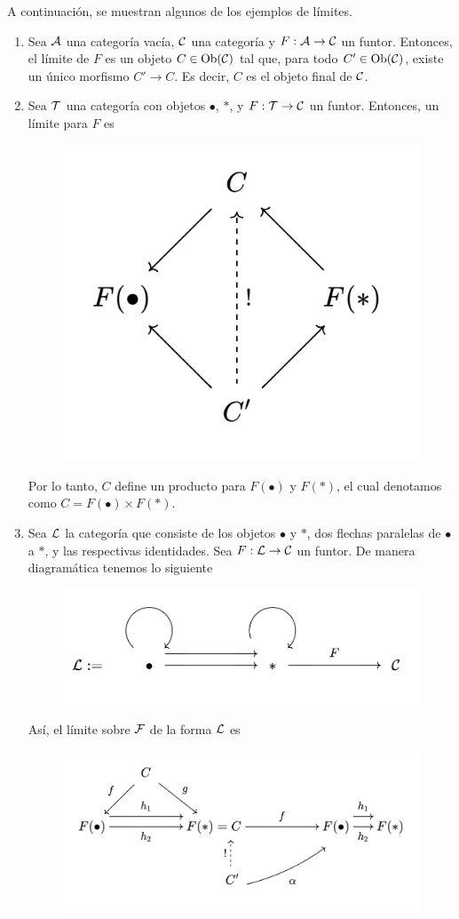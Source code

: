 A continuación, se muestran algunos de los ejemplos de límites. 
\begin{ejp}\label{ejp:lim}\text{ }
    \begin{enumerate}
        \item Sea ${\mathcal A}$ una categoría vacía, ${\mathcal C}$ una categoría y $F:{\mathcal A}\to{\mathcal C}$ un funtor. Entonces, el límite de $F$ es un objeto $C\in\operatorname{Ob}({\mathcal C})$ tal que, para todo $C'\in\operatorname{Ob}({\mathcal C})$, existe un único morfismo $C'\to C$. Es decir, $C$ es el objeto final de ${\mathcal C}$.
        \item Sea ${\mathcal T}$ una categoría con  objetos $\bullet$, $*$, y  $F:{\mathcal T}\to {\mathcal C}$ un funtor. Entonces, un límite para $F$ es 
        \begin{figure}[H]
            \centering
            \includegraphics[width=0.3\linewidth]{img/diagrama5.png}
        \end{figure}
        Por lo tanto, $C$ define un producto para $F(\bullet)$ y $F(*)$, el cual denotamos como $C=F(\bullet)\times F(*)$.
        \item Sea ${\mathcal L}$ la categoría que consiste de los objetos $\bullet$ y $*$, dos flechas paralelas de $\bullet$ a $*$, y las respectivas identidades. Sea $F:{\mathcal L}\to{\mathcal C}$ un funtor. De manera diagramática tenemos lo siguiente
        \begin{figure}[H]
            \centering
            \includegraphics[width=0.5\linewidth]{img/diagrama6.png}
        \end{figure}
        Así, el límite sobre ${\mathcal F}$ de la forma ${\mathcal L}$ es 
        \begin{figure}[H]
            \centering
            \includegraphics[width=0.6\linewidth]{img/diagrama7.png}

\end{figure}
\end{enumerate}
\end{ejp}
